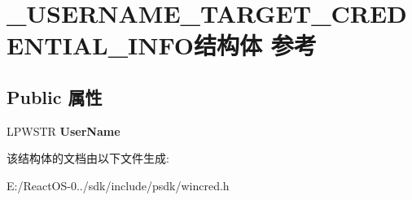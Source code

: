 \hypertarget{struct___u_s_e_r_n_a_m_e___t_a_r_g_e_t___c_r_e_d_e_n_t_i_a_l___i_n_f_o}{}\section{\+\_\+\+U\+S\+E\+R\+N\+A\+M\+E\+\_\+\+T\+A\+R\+G\+E\+T\+\_\+\+C\+R\+E\+D\+E\+N\+T\+I\+A\+L\+\_\+\+I\+N\+F\+O结构体 参考}
\label{struct___u_s_e_r_n_a_m_e___t_a_r_g_e_t___c_r_e_d_e_n_t_i_a_l___i_n_f_o}
\subsection*{Public 属性}
\begin{DoxyCompactItemize}
\item 
\mbox{\label{struct___u_s_e_r_n_a_m_e___t_a_r_g_e_t___c_r_e_d_e_n_t_i_a_l___i_n_f_o_aefd7ea817c7100551980f01a888a82b5}} 
L\+P\+W\+S\+TR {\bfseries User\+Name}
\end{DoxyCompactItemize}


该结构体的文档由以下文件生成\+:\begin{DoxyCompactItemize}
\item 
E\+:/\+React\+O\+S-\/0../sdk/include/psdk/wincred.\+h\end{DoxyCompactItemize}
